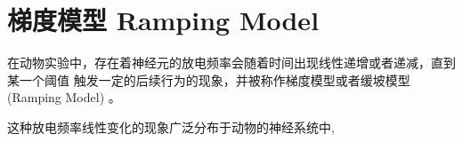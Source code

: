 \section{梯度模型 Ramping Model}

在动物实验中，存在着神经元的放电频率会随着时间出现线性递增或者递减，直到某一个阈值
触发一定的后续行为的现象，并被称作梯度模型或者缓坡模型(Ramping Model)
\cite{durstewitz2003self,simen2011model,paton2018neural}。

这种放电频率线性变化的现象广泛分布于动物的神经系统中\cite{durstewitz2003self},


